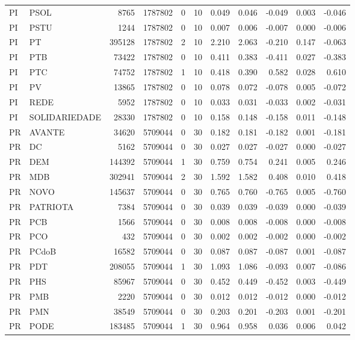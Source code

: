 \begin{landscape}
\begin{longtable}{llrrrrrrrrr}
PI & PSOL & 8765 & 1787802 & 0 & 10 & 0.049 & 0.046 & -0.049 & 0.003 & -0.046 \\
PI & PSTU & 1244 & 1787802 & 0 & 10 & 0.007 & 0.006 & -0.007 & 0.000 & -0.006 \\
PI & PT & 395128 & 1787802 & 2 & 10 & 2.210 & 2.063 & -0.210 & 0.147 & -0.063 \\
PI & PTB & 73422 & 1787802 & 0 & 10 & 0.411 & 0.383 & -0.411 & 0.027 & -0.383 \\
PI & PTC & 74752 & 1787802 & 1 & 10 & 0.418 & 0.390 & 0.582 & 0.028 & 0.610 \\
PI & PV & 13865 & 1787802 & 0 & 10 & 0.078 & 0.072 & -0.078 & 0.005 & -0.072 \\
PI & REDE & 5952 & 1787802 & 0 & 10 & 0.033 & 0.031 & -0.033 & 0.002 & -0.031 \\
PI & SOLIDARIEDADE & 28330 & 1787802 & 0 & 10 & 0.158 & 0.148 & -0.158 & 0.011 & -0.148 \\
PR & AVANTE & 34620 & 5709044 & 0 & 30 & 0.182 & 0.181 & -0.182 & 0.001 & -0.181 \\
PR & DC & 5162 & 5709044 & 0 & 30 & 0.027 & 0.027 & -0.027 & 0.000 & -0.027 \\
PR & DEM & 144392 & 5709044 & 1 & 30 & 0.759 & 0.754 & 0.241 & 0.005 & 0.246 \\
PR & MDB & 302941 & 5709044 & 2 & 30 & 1.592 & 1.582 & 0.408 & 0.010 & 0.418 \\
PR & NOVO & 145637 & 5709044 & 0 & 30 & 0.765 & 0.760 & -0.765 & 0.005 & -0.760 \\
PR & PATRIOTA & 7384 & 5709044 & 0 & 30 & 0.039 & 0.039 & -0.039 & 0.000 & -0.039 \\
PR & PCB & 1566 & 5709044 & 0 & 30 & 0.008 & 0.008 & -0.008 & 0.000 & -0.008 \\
PR & PCO & 432 & 5709044 & 0 & 30 & 0.002 & 0.002 & -0.002 & 0.000 & -0.002 \\
PR & PCdoB & 16582 & 5709044 & 0 & 30 & 0.087 & 0.087 & -0.087 & 0.001 & -0.087 \\
PR & PDT & 208055 & 5709044 & 1 & 30 & 1.093 & 1.086 & -0.093 & 0.007 & -0.086 \\
PR & PHS & 85967 & 5709044 & 0 & 30 & 0.452 & 0.449 & -0.452 & 0.003 & -0.449 \\
PR & PMB & 2220 & 5709044 & 0 & 30 & 0.012 & 0.012 & -0.012 & 0.000 & -0.012 \\
PR & PMN & 38549 & 5709044 & 0 & 30 & 0.203 & 0.201 & -0.203 & 0.001 & -0.201 \\
PR & PODE & 183485 & 5709044 & 1 & 30 & 0.964 & 0.958 & 0.036 & 0.006 & 0.042 \\

\end{longtable}
\end{landscape}
